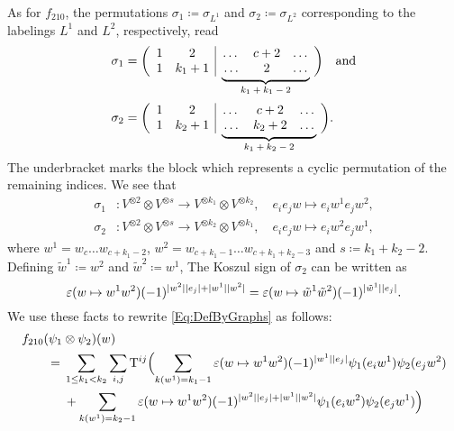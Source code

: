 \documentclass[\MainFolder/Text.tex]{subfiles}
\begin{document}
\begin{Example}
As for $f_{210}$, the permutations $\sigma_1\coloneqq\sigma_{L^1}$ and $\sigma_2\coloneqq \sigma_{L^2}$ corresponding to the labelings $L^1$ and $L^2$, respectively, read
\[\begin{aligned}
\sigma_{1} &= \biggl(\begin{array}{cc|ccc}
 1 & 2     & \dots & c+2 & \dots \\
 1 & k_1+1 & \undermat{k_1+k_1-2}{\dots& c+2 & \dots}\dots & 2& \dots 
\end{array}\biggr)\quad\text{and}\\[4ex]
\sigma_{2} &= \biggl(\begin{array}{cc|ccc}
 1 & 2     & \dots & c+2 & \dots  \\
 1 & k_2+1 & \undermat{k_1+k_2-2}{\dots & k_2 + 2 & \dots}\dots & k_2 + 2 & \dots
\end{array}\biggr).\\[3ex]
\end{aligned}\]
The underbracket marks the block which represents a cyclic permutation of the remaining indices. We see that 
\[\begin{aligned}
\sigma_{1}&:  V^{\otimes 2} \otimes V^{\otimes s} \longrightarrow V^{\otimes k_1}\otimes V^{\otimes k_2},\quad e_i e_j w \longmapsto e_i w^1 e_j w^2,  \\
\sigma_{2}&: V^{\otimes 2}\otimes V^{\otimes s} \longrightarrow V^{\otimes k_2}\otimes V^{\otimes k_1},\quad e_i e_j w  \longmapsto e_i w^2 e_j w^1,
\end{aligned}\]
where $w^1 = w_c \dots w_{c+k_1-2}$, $w^2 = w_{c+k_1-1}\dots w_{c+k_1+k_2-3}$ and $s \coloneqq k_1 + k_2 - 2$. Defining $\tilde{w}^1 \coloneqq w^2$ and $\tilde{w}^2 \coloneqq w^1$, The Koszul sign of $\sigma_2$ can be written as
\[ \varepsilon(w\mapsto w^1 w^2) (-1)^{|w^2||e_j| + |w^1||w^2|} = \varepsilon(w\mapsto \tilde{w}^1 \tilde{w}^2 ) (-1)^{|\tilde{w}^1| |e_j|}. \]
We use these facts to rewrite \eqref{Eq:DefByGraphs} as follows:
\begin{align*}
& f_{210}(\psi_1 \otimes \psi_2)(w) \\
&\qquad=\begin{aligned}[t]
& \sum_{\substack{1\le k_1 < k_2}} \sum_{i,j} \TKer^{ij} \Bigl(\sum_{k(w^1) = k_1 - 1} \varepsilon(w\mapsto w^1 w^2)(-1)^{\Abs{w^1}\Abs{e_j}} \psi_1(e_i w^1) \psi_2(e_j w^2) \\
&{}+ \sum_{k(w^1) = k_2 - 1} \varepsilon(w\mapsto w^1 w^2) (-1)^{\Abs{w^2}\Abs{e_j} + \Abs{w^1}\Abs{w^2}} \psi_1(e_i w^2) \psi_2(e_j w^1)\Bigr) \\

\end{aligned}
\end{align*}
\end{Example}
\end{document}
